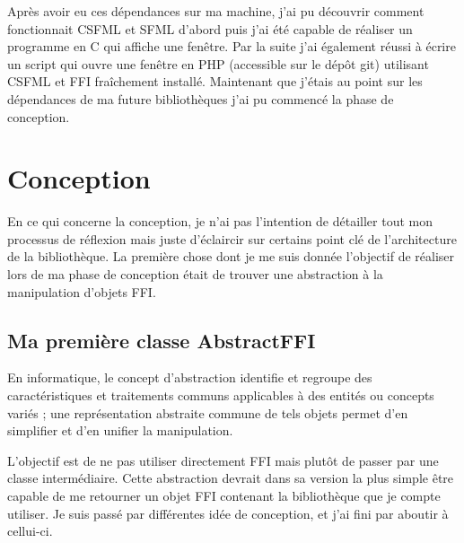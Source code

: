 \documentclass[11pt,a4paper,krantz2,11pt,oneside]{krantz}
\renewenvironment{quote}{\begin{VF}}{\end{VF}}
\begin{document}
Après avoir eu ces dépendances sur ma machine, j'ai pu découvrir comment fonctionnait CSFML et SFML d'abord puis j'ai été capable de réaliser un programme en C qui affiche une fenêtre. Par la suite j'ai également réussi à écrire un script qui ouvre une fenêtre en PHP (accessible sur le dépôt git) utilisant CSFML et FFI fraîchement installé. Maintenant que j'étais au point sur les dépendances de ma future bibliothèques j'ai pu commencé la phase de conception.

\hypertarget{conception}{%
\section{Conception}\label{conception}}

En ce qui concerne la conception, je n'ai pas l'intention de détailler tout mon processus de réflexion mais juste d'éclaircir sur certains point clé de l'architecture de la bibliothèque. La première chose dont je me suis donnée l'objectif de réaliser lors de ma phase de conception était de trouver une abstraction à la manipulation d'objets FFI.

\hypertarget{ma-premiuxe8re-classe-abstractffi}{%
\subsection{Ma première classe AbstractFFI}\label{ma-premiuxe8re-classe-abstractffi}}

\begin{quote}
En informatique, le concept d'abstraction identifie et regroupe des caractéristiques et traitements communs applicables à des entités ou concepts variés ; une représentation abstraite commune de tels objets permet d'en simplifier et d'en unifier la manipulation.

\end{quote}

L'objectif est de ne pas utiliser directement FFI mais plutôt de passer par une classe intermédiaire. Cette abstraction devrait dans sa version la plus simple être capable de me retourner un objet FFI contenant la bibliothèque que je compte utiliser. Je suis passé par différentes idée de conception, et j'ai fini par aboutir à cellui-ci.
\end{document}
